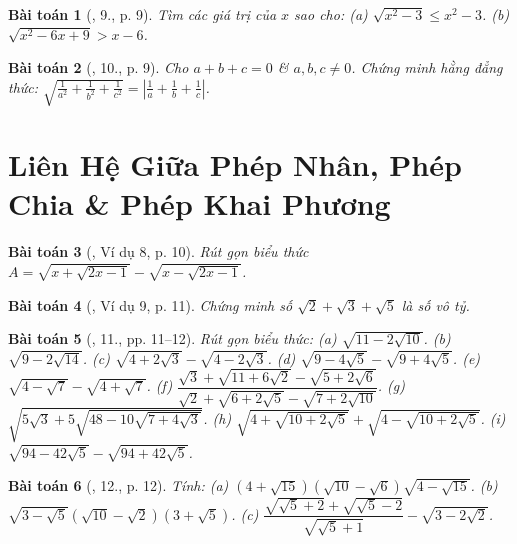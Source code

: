 \documentclass{article}
\newtheorem{baitoan}{Bài toán}
\begin{document}
\begin{baitoan}[\cite{Binh_Toan_9_tap_1}, 9., p. 9]
	Tìm các giá trị của $x$ sao cho: (a) $\sqrt{x^2 - 3}\le x^2 - 3$. (b) $\sqrt{x^2 - 6x + 9} > x - 6$.
\end{baitoan}

\begin{baitoan}[\cite{Binh_Toan_9_tap_1}, 10., p. 9]
	Cho $a + b + c = 0$ \& $a,b,c\ne0$. Chứng minh hằng đẳng thức: $\sqrt{\frac{1}{a^2} + \frac{1}{b^2} + \frac{1}{c^2}} = \left|\frac{1}{a} + \frac{1}{b} + \frac{1}{c}\right|$.
\end{baitoan}


\section{Liên Hệ Giữa Phép Nhân, Phép Chia \& Phép Khai Phương}

\begin{baitoan}[\cite{Binh_Toan_9_tap_1}, Ví dụ 8, p. 10]
	Rút gọn biểu thức $A = \sqrt{x + \sqrt{2x - 1}} - \sqrt{ x - \sqrt{2x - 1}}$.
\end{baitoan}

\begin{baitoan}[\cite{Binh_Toan_9_tap_1}, Ví dụ 9, p. 11]
	Chứng minh số $\sqrt{2} + \sqrt{3} + \sqrt{5}$ là số vô tỷ.
\end{baitoan}

\begin{baitoan}[\cite{Binh_Toan_9_tap_1}, 11., pp. 11--12]
	Rút gọn biểu thức: (a) $\sqrt{11 - 2\sqrt{10}}$. (b) $\sqrt{9 - 2\sqrt{14}}$. (c) $\sqrt{4 + 2\sqrt{3}} - \sqrt{4 - 2\sqrt{3}}$. (d) $\sqrt{9 - 4\sqrt{5}} - \sqrt{9 + 4\sqrt{5}}$. (e) $\sqrt{4 - \sqrt{7}} - \sqrt{4 + \sqrt{7}}$. (f) $\dfrac{\sqrt{3} + \sqrt{11 + 6\sqrt{2}}- \sqrt{5 + 2\sqrt{6}}}{\sqrt{2} + \sqrt{6 + 2\sqrt{5}} - \sqrt{7 + 2\sqrt{10}}}$. (g) $\sqrt{5\sqrt{3} + 5\sqrt{48 - 10\sqrt{7+ 4\sqrt{3}}}}$. (h) $\sqrt{4 + \sqrt{10 + 2\sqrt{5}}} + \sqrt{4 - \sqrt{10 + 2\sqrt{5}}}$. (i) $\sqrt{94 - 42\sqrt{5}} - \sqrt{94 + 42\sqrt{5}}$.
\end{baitoan}

\begin{baitoan}[\cite{Binh_Toan_9_tap_1}, 12., p. 12]
	Tính: (a) $(4 + \sqrt{15})(\sqrt{10} - \sqrt{6})\sqrt{4 - \sqrt{15}}$. (b) $\sqrt{3 - \sqrt{5}}(\sqrt{10} - \sqrt{2})(3 + \sqrt{5})$. (c) $\dfrac{\sqrt{\sqrt{5} + 2} + \sqrt{\sqrt{5} - 2}}{\sqrt{\sqrt{5} + 1}} - \sqrt{3 - 2\sqrt{2}}$.
\end{baitoan}
\end{document}
